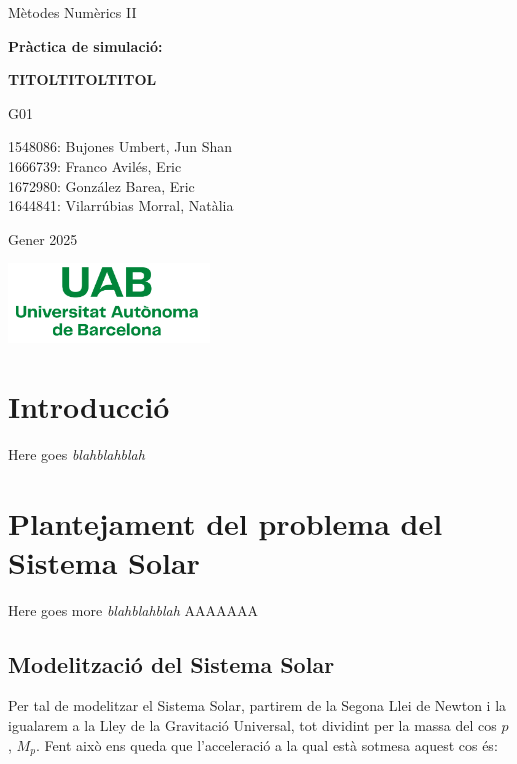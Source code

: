 \documentclass[10pt, twoside, a4paper]{article}
\begin{document}
\begin{titlepage}
\centering
{\LARGE Mètodes Numèrics II \par}
\vspace{2cm}
{\Huge \textbf{Pràctica de simulació:} \par}
\vspace{1cm}
{\Huge \textbf{TITOLTITOLTITOL} \par}
\vspace{3cm}
{\Large G01 \par}
\vspace{0.5cm}
{\Large 1548086: Bujones Umbert, Jun Shan\\1666739: Franco Avilés, Eric\\  1672980: González Barea, Eric\\1644841: Vilarrúbias Morral, Natàlia \par}
\vspace{2cm}
{\Large Gener 2025 \par}
\vspace{2cm}
\includegraphics[width=0.4\textwidth]{Logo_UAB.png}


\end{titlepage}

\renewcommand{\cftsecfont}{}
\renewcommand{\cftsecpagefont}{}
\renewcommand{\cftsecleader}{\cftdotfill{\cftdotsep}}
\renewcommand{\cftdotsep}{0.2}
\setlength{\cftbeforesecskip}{0.5em}
\setlength{\cftbeforesubsecskip}{0.5em}
\tableofcontents

\newpage
{}
\setcounter{page}{1}

\pagestyle{fancy}

\section{Introducció}
Here goes \textit{blahblahblah}

\section{Plantejament del problema del Sistema Solar}
Here goes more \textit{blahblahblah}  AAAAAAA

\subsection{Modelització del Sistema Solar}
Per tal de modelitzar el Sistema Solar, partirem de la Segona Llei de Newton i la igualarem a la Lley de la Gravitació Universal, tot dividint per la massa del cos $p$, $M_p$. Fent això ens queda que l'acceleració a la qual està sotmesa aquest cos és:
\end{document}
